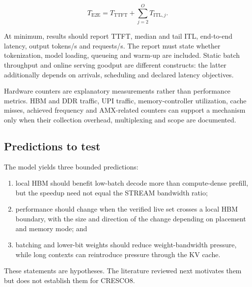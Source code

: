 \[
  T_{\mathrm{E2E}}
  =
  T_{\mathrm{TTFT}} +
  \sum_{j=2}^{O} T_{\mathrm{ITL},j}.
\]

At minimum, results should report TTFT, median and tail ITL, end-to-end
latency, output tokens/s and requests/s.  The report must state whether
tokenization, model loading, queueing and warm-up are included.  Static
batch throughput and online serving goodput are different constructs:
the latter additionally depends on arrivals, scheduling and declared
latency objectives.

Hardware counters are explanatory measurements rather than performance
metrics.  HBM and DDR traffic, UPI traffic, memory-controller
utilization, cache misses, achieved frequency and AMX-related counters
can support a mechanism only when their collection overhead,
multiplexing and scope are documented.

\subsection{Predictions to test}

The model yields three bounded predictions:

\begin{enumerate}
  \item local HBM should benefit low-batch decode more than compute-dense
        prefill, but the speedup need not equal the STREAM bandwidth
        ratio;
  \item performance should change when the verified live set crosses a
        local HBM boundary, with the size and direction of the change
        depending on placement and memory mode; and
  \item batching and lower-bit weights should reduce weight-bandwidth
        pressure, while long contexts can reintroduce pressure through
        the KV cache.
\end{enumerate}

These statements are hypotheses.  The literature reviewed next
motivates them but does not establish them for CRESCO8.
